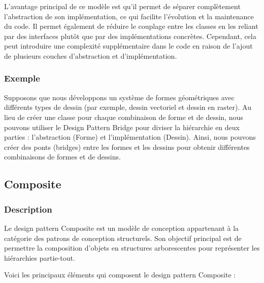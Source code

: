 L'avantage principal de ce modèle est qu'il permet de séparer complètement l'abstraction de son implémentation, ce qui facilite l'évolution et la maintenance du code. Il permet également de réduire le couplage entre les classes en les reliant par des interfaces plutôt que par des implémentations concrètes. Cependant, cela peut introduire une complexité supplémentaire dans le code en raison de l'ajout de plusieurs couches d'abstraction et d'implémentation.


\subsubsection{Exemple}

Supposons que nous développons un système de formes géométriques avec différents types de dessin (par exemple, dessin vectoriel et dessin en raster). Au lieu de créer une classe pour chaque combinaison de forme et de dessin, nous pouvons utiliser le Design Pattern Bridge pour diviser la hiérarchie en deux parties : l'abstraction (Forme) et l'implémentation (Dessin). Ainsi, nous pouvons créer des ponts (bridges) entre les formes et les dessins pour obtenir différentes combinaisons de formes et de dessins.




\newpage

\subsection{Composite}

\subsubsection{Description}

Le design pattern Composite est un modèle de conception appartenant à la catégorie des patrons de conception structurels. Son objectif principal est de permettre la composition d'objets en structures arborescentes pour représenter les hiérarchies partie-tout.

Voici les principaux éléments qui composent le design pattern Composite :

